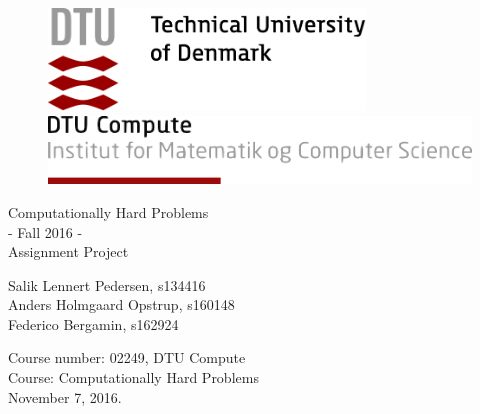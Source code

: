 \documentclass[paper=a4, fontsize=12pt]{scrartcl}
\begin{document}
	
	\begin{titlepage}
		\begin{center}
			
			\begin{figure}[!ht]
				\centering
				\begin{minipage}[b]{0.45\textwidth}
					\includegraphics[width=0.75\textwidth]{imgs/DTUlogo.png}
				\end{minipage}
				\hfill
				\begin{minipage}[b]{0.45\textwidth}
					\includegraphics[width=\textwidth]{imgs/DTUCompute.png}
				\end{minipage}
			\end{figure}
			\vspace{1.5cm}
			\Huge Computationally Hard Problems \\ - Fall 2016 - \\ Assignment Project \\
			
			
			\vspace{2cm}
			
			
			\large {Salik Lennert Pedersen, s134416}  \\
			\large {Anders Holmgaard Opstrup, s160148} \\
			\large {Federico Bergamin, s162924} 
			
			\vspace{2cm}
			
			\large Course number: 02249, DTU Compute \\
			Course: Computationally Hard Problems \\ 
			\vfill
			\large November 7, 2016.
			
			
			
		\end{center}
	\end{titlepage}

   \thispagestyle{empty}
   \null\newpage
   \thispagestyle{empty}
	
\end{document}
